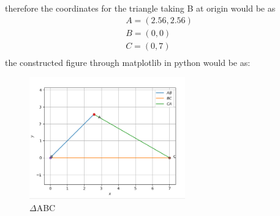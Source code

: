 \documentclass{article}
\begin{document}
therefore the coordinates for the triangle taking B at origin would be as
\begin{gather*}
    A = (2.56,2.56)\\
    B = (0, 0) \\
    C = (0 , 7)\\
\end{gather*}
the constructed figure through matplotlib in python would be as:
\begin{figure}[h!]
    \centering
    \includegraphics[height = 200]{code.PNG}
    \caption{$\Delta$ABC}
    \label{fig:my_label}
\end{figure}
\end{document}
